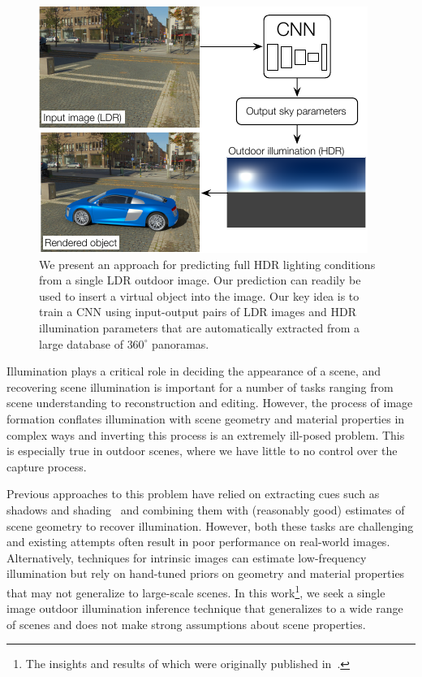 
\begin{figure}
\centering
\includegraphics[width=\linewidth]{figures/teaser/teaser-skymodel.pdf}
\caption[Presentation of the proposed method]{We present an approach for predicting full HDR lighting conditions from a single LDR outdoor image. Our prediction can readily be used to insert a virtual object into the image. Our key idea is to train a CNN using input-output pairs of LDR images and HDR illumination parameters that are automatically extracted from a large database of $360^\circ$ panoramas.}
\label{fig:teaser}
\vspace{-1em}
\end{figure}

Illumination plays a critical role in deciding the appearance of a scene, and recovering scene illumination is important for a number of tasks ranging from scene understanding to reconstruction and editing. However, the process of image formation conflates illumination with scene geometry and material properties in complex ways and inverting this process is an extremely ill-posed problem. This is especially true in outdoor scenes, where we have little to no control over the capture process.

Previous approaches to this problem have relied on extracting cues such as shadows and shading~\cite{lalonde-ijcv-12} and combining them with (reasonably good) estimates of scene geometry to recover illumination. However, both these tasks are challenging and existing attempts often result in poor performance on real-world images. Alternatively, techniques for intrinsic images can estimate low-frequency illumination but rely on hand-tuned priors on geometry and material properties~\cite{barron-pami-15,lombardi2016reflectance} that may not generalize to large-scale scenes. In this work\footnote{The insights and results of which were originally published in~\cite{holdgeoffroy-cvpr-17}.}, we seek a single image outdoor illumination inference technique that generalizes to a wide range of scenes and does not make strong assumptions about scene properties.

